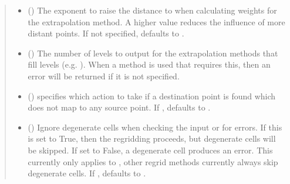 \documentclass[letterpaper,10pt,english]{sphinxmanual}
\begin{document}
\begin{fulllineitems}
\begin{quote}
\begin{description}
\begin{itemize}
\item {} 
 () \textendash{} The exponent to raise the distance to when 
calculating weights for the {\hyperref[\detokenize{ExtrapMethod:ESMF.api.constants.ExtrapMethod.NEAREST_IDAVG}]{}}
extrapolation method. A higher value reduces the influence of more distant
points. If not specified, defaults to .

\item {} 
 () \textendash{} The number of levels to output for the extrapolation 
methods that fill levels (e.g. ). 
When a method is used that requires this, then an error will be returned if it 
is not specified.

\item {} 
 ({\hyperref[\detokenize{UnmappedAction:ESMF.api.constants.UnmappedAction}]{}}) \textendash{} specifies which action to take if a
destination point is found which does not map to any source point. If
, defaults to {\hyperref[\detokenize{UnmappedAction:ESMF.api.constants.UnmappedAction.ERROR}]{}}.

\item {} 
 () \textendash{} Ignore degenerate cells when checking the
input {\hyperref[\detokenize{grid:ESMF.api.grid.Grid}]{}} or {\hyperref[\detokenize{mesh:ESMF.api.mesh.Mesh}]{}}
for errors. If this is set to True, then the regridding proceeds, but
degenerate cells will be skipped. If set to False, a degenerate cell produces
an error. This currently only applies to {\hyperref[\detokenize{RegridMethod:ESMF.api.constants.RegridMethod.CONSERVE}]{}},
other regrid methods currently always skip degenerate cells. If , defaults
to .


\end{itemize}
\end{description}
\end{quote}
\end{fulllineitems}
\end{document}
